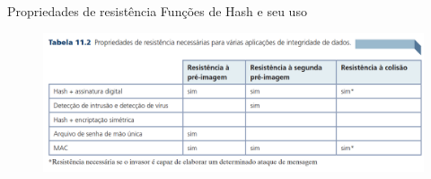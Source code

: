 \begin{frame}{Propriedades de resistência Funções de Hash e seu uso}

    \begin{figure}
        \centering
        \includegraphics[width=\linewidth]{Figuras/propriedades-resistencia-hash.png}

    \end{figure}
\end{frame}

